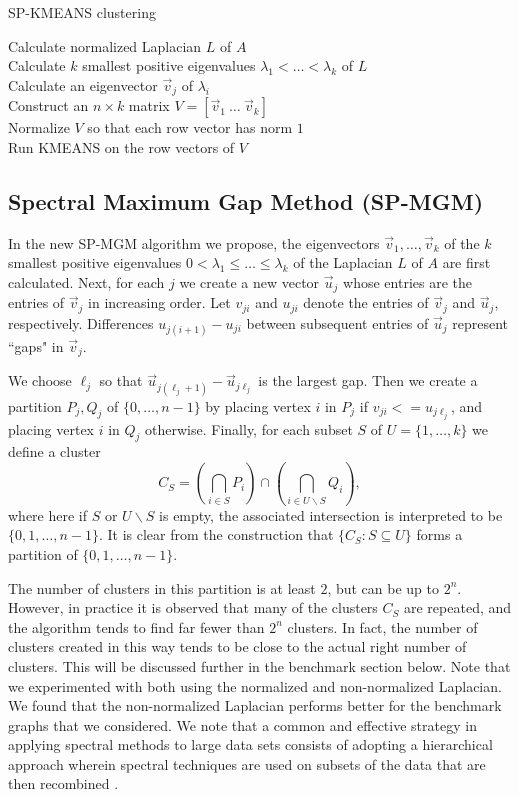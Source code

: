 \documentclass[10pt,journal,compsoc]{IEEEtran} %
\theoremstyle{definition}
\newcommand{\diff}{\backslash}
\begin{document}
\begin{algorithm}
    \caption{SP-KMEANS clustering} 
   Calculate normalized Laplacian $L$
of $A$\\ Calculate $k$ smallest positive eigenvalues
$\lambda_1<\dots<\lambda_k$ of $L$\\ Calculate an eigenvector $\vec
v_j$ of $\lambda_i$\\ Construct an $n\times k$ matrix $V= [\vec v_1\
\dots\ \vec v_k]$\\ Normalize $V$ so that each row vector has norm
$1$\\ Run KMEANS on the row vectors of $V$
\end{algorithm}

\subsection{Spectral Maximum Gap Method (SP-MGM)} 
In the new SP-MGM algorithm we propose, the eigenvectors
$\vec v_1,\dots,\vec v_k$ of the $k$ smallest positive eigenvalues
$0<\lambda_1\leq\dots\leq \lambda_k$ of the Laplacian $L$ of $A$ are
first calculated.  Next, for each $j$ we create a new vector
$\vec u_j$ whose entries are the entries of $\vec v_j$ in increasing
order.  Let $v_{ji}$ and $u_{ji}$ denote the entries of $\vec v_j$ and
$\vec u_j$, respectively.  Differences $u_{j(i+1)}-u_{ji}$ between
subsequent entries of $\vec u_j$ represent ``gaps" in $\vec v_j$.

We choose $\ell_j$ so that $\vec u_{j(\ell_j+1)}-\vec u_{j\ell_j}$ is
the largest gap.  Then we create a partition $P_j,Q_j$ of $\{0,\dots,
n-1\}$ by placing vertex $i$ in $P_j$ if $v_{ji} <= u_{j\ell_j}$, and
placing vertex $i$ in $Q_j$ otherwise.  Finally, for each subset $S$
of $U=\{1,\dots,k\}$ we define a cluster
$$C_S = \left(\bigcap_{i\in S}P_i\right)\cap\left(\bigcap_{i\in U\diff S}Q_i\right),$$
where here if $S$ or $U\diff S$ is empty, the associated intersection
is interpreted to be $\{0,1,\dots,n-1\}$.  It is clear from the
construction that $\{C_S: S\subseteq U\}$ forms a partition of
$\{0,1,\dots,n-1\}$.

The number of clusters in this partition is at least $2$, but can be
up to $2^n$.  However, in practice it is observed that many of the
clusters $C_S$ are repeated, and the algorithm tends to find far fewer
than $2^n$ clusters.  In fact, the number of clusters created in this
way tends to be close to the actual right number of clusters.  This
will be discussed further in the benchmark section below.  Note that
we experimented with both using the normalized and non-normalized
Laplacian.  We found that the non-normalized Laplacian performs better
for the benchmark graphs that we considered.  We note that a common and
effective strategy in applying spectral methods to large data sets
consists of adopting a hierarchical approach wherein spectral
techniques are used on subsets of the data that are then recombined
\citep[e.g., see][]{luxburg2005limits, tung2010enabling, semertzidis2015large, peluffo2014short}.
\end{document}
